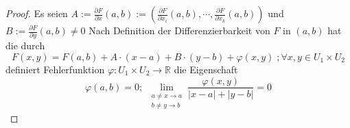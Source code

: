 %	
%	
%	
%	
\begin{proof}
	Es seien $ A := \frac{\partial F}{\partial x} (a,b) := \left( \frac{\partial F}{\partial x_i} (a,b) , \cdots,  \frac{\partial F}{\partial x_k} (a,b) \right)   $  und $ B := \frac{\partial F}{\partial y} (a,b) \neq 0 $ 
	Nach Definition der Differenzierbarkeit von $ F $ in $ (a,b) $ hat die durch 
	\begin{equation}
		F (x,y) = F (a,b) + A \cdot (x-a) + B \cdot (y-b) + \varphi (x,y) \; ; \forall x,y \in U_1 \times U_2
		\tag{1}
	\end{equation}
	definiert Fehlerfunktion $ \varphi : U_1 \times U_2 \to \mathbb{R}  $ die Eigenschaft 
	\begin{equation}
	\varphi (a,b) = 0 ; \; \lim_{ \substack{ a \neq x \to a \\ b \neq y \to b} } \frac{\varphi(x,y)}{ |x-a| + |y-b|} = 0  
	\tag{2}
\end{equation}


\end{proof}
